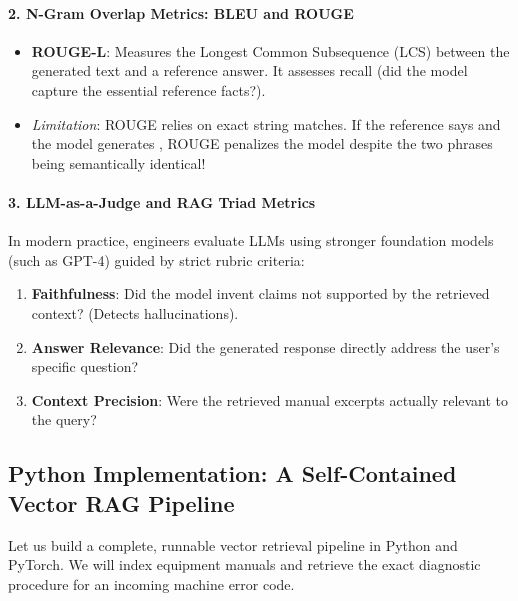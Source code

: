 \paragraph{2. N-Gram Overlap Metrics: BLEU and ROUGE}
\begin{itemize}
    \item \textbf{ROUGE-L}: Measures the Longest Common Subsequence (LCS) between the generated text and a reference answer. It assesses recall (did the model capture the essential reference facts?).
    \item \emph{Limitation}: ROUGE relies on exact string matches. If the reference says  and the model generates , ROUGE penalizes the model despite the two phrases being semantically identical!
\end{itemize}

\paragraph{3. LLM-as-a-Judge and RAG Triad Metrics}
In modern practice, engineers evaluate LLMs using stronger foundation models (such as GPT-4) guided by strict rubric criteria:
\begin{enumerate}
    \item \textbf{Faithfulness}: Did the model invent claims not supported by the retrieved context? (Detects hallucinations).
    \item \textbf{Answer Relevance}: Did the generated response directly address the user's specific question?
    \item \textbf{Context Precision}: Were the retrieved manual excerpts actually relevant to the query?
\end{enumerate}

\subsection{Python Implementation: A Self-Contained Vector RAG Pipeline}\label{subsec:python_rag}

Let us build a complete, runnable vector retrieval pipeline in Python and PyTorch. We will index equipment manuals and retrieve the exact diagnostic procedure for an incoming machine error code.

